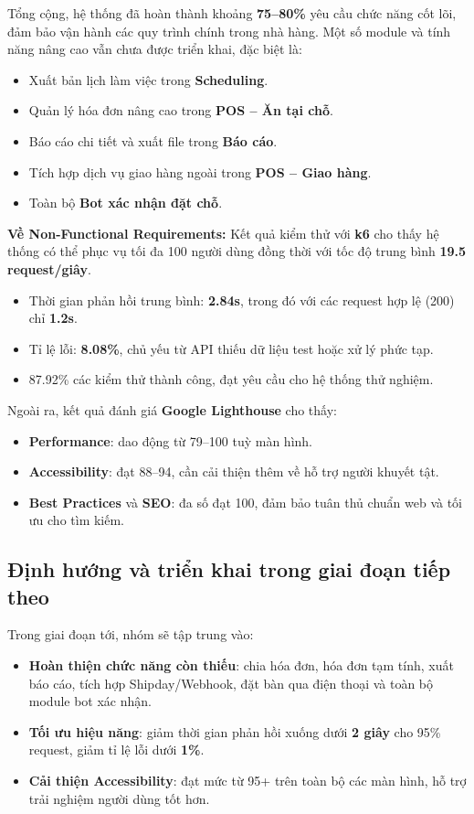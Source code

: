 Tổng cộng, hệ thống đã hoàn thành khoảng \textbf{75–80\%} yêu cầu chức năng cốt lõi, đảm bảo vận hành các quy trình chính trong nhà hàng. Một số module và tính năng nâng cao vẫn chưa được triển khai, đặc biệt là:
\begin{itemize}
    \item Xuất bản lịch làm việc trong \textbf{Scheduling}.
    \item Quản lý hóa đơn nâng cao trong \textbf{POS – Ăn tại chỗ}.
    \item Báo cáo chi tiết và xuất file trong \textbf{Báo cáo}.
    \item Tích hợp dịch vụ giao hàng ngoài trong \textbf{POS – Giao hàng}.
    \item Toàn bộ \textbf{Bot xác nhận đặt chỗ}.
\end{itemize}

\textbf{Về Non-Functional Requirements:}  
Kết quả kiểm thử với \textbf{k6} cho thấy hệ thống có thể phục vụ tối đa 100 người dùng đồng thời với tốc độ trung bình \textbf{19.5 request/giây}.  
\begin{itemize}
    \item Thời gian phản hồi trung bình: \textbf{2.84s}, trong đó với các request hợp lệ (200) chỉ \textbf{1.2s}.
    \item Tỉ lệ lỗi: \textbf{8.08\%}, chủ yếu từ API thiếu dữ liệu test hoặc xử lý phức tạp.
    \item 87.92\% các kiểm thử thành công, đạt yêu cầu cho hệ thống thử nghiệm.
\end{itemize}

Ngoài ra, kết quả đánh giá \textbf{Google Lighthouse} cho thấy:
\begin{itemize}
    \item \textbf{Performance}: dao động từ 79–100 tuỳ màn hình.
    \item \textbf{Accessibility}: đạt 88–94, cần cải thiện thêm về hỗ trợ người khuyết tật.
    \item \textbf{Best Practices} và \textbf{SEO}: đa số đạt 100, đảm bảo tuân thủ chuẩn web và tối ưu cho tìm kiếm.
\end{itemize}

\subsection{Định hướng và triển khai trong giai đoạn tiếp theo}

Trong giai đoạn tới, nhóm sẽ tập trung vào:
\begin{itemize}
    \item \textbf{Hoàn thiện chức năng còn thiếu}: chia hóa đơn, hóa đơn tạm tính, xuất báo cáo, tích hợp Shipday/Webhook, đặt bàn qua điện thoại và toàn bộ module bot xác nhận.
    \item \textbf{Tối ưu hiệu năng}: giảm thời gian phản hồi xuống dưới \textbf{2 giây} cho 95\% request, giảm tỉ lệ lỗi dưới \textbf{1\%}.
    \item \textbf{Cải thiện Accessibility}: đạt mức từ 95+ trên toàn bộ các màn hình, hỗ trợ trải nghiệm người dùng tốt hơn.
\end{itemize}

